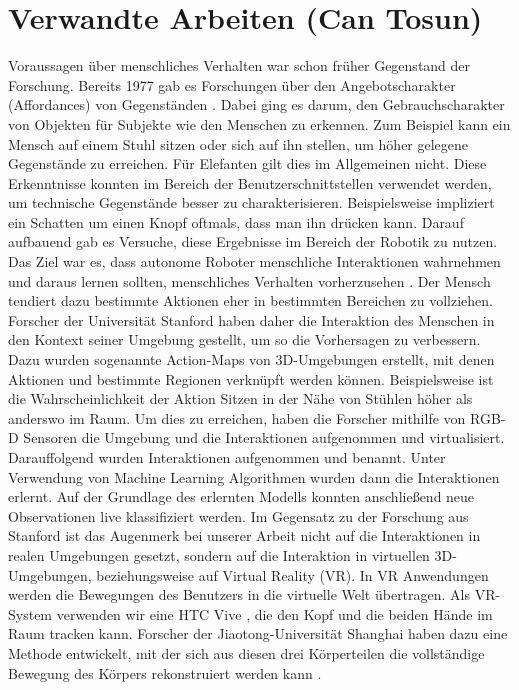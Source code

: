 
\section{Verwandte Arbeiten \tiny{(Can Tosun)}}
Voraussagen über menschliches Verhalten war schon früher Gegenstand der Forschung. Bereits 1977 gab es Forschungen über den Angebotscharakter (Affordances) von Gegenständen \cite{gibson}. Dabei ging es darum, den Gebrauchscharakter von Objekten für Subjekte wie den Menschen zu erkennen. Zum Beispiel kann ein Mensch auf einem Stuhl sitzen oder sich auf ihn stellen, um höher gelegene Gegenstände zu erreichen. Für Elefanten gilt dies im Allgemeinen nicht. Diese Erkenntnisse konnten im Bereich der Benutzerschnittstellen verwendet werden, um technische Gegenstände besser zu charakterisieren. Beispielsweise impliziert ein Schatten um einen Knopf oftmals, dass man ihn drücken kann.
\newline
Darauf aufbauend gab es Versuche, diese Ergebnisse im Bereich der Robotik zu nutzen. Das Ziel war es, dass autonome Roboter menschliche Interaktionen wahrnehmen und daraus lernen sollten, menschliches Verhalten vorherzusehen \cite{fritz, montesano,stark, sun}.
\newline
Der Mensch tendiert dazu bestimmte Aktionen eher in bestimmten Bereichen zu vollziehen. Forscher der Universität Stanford haben daher
die Interaktion des Menschen in den Kontext seiner Umgebung gestellt, um so die Vorhersagen zu verbessern. Dazu wurden sogenannte
Action-Maps von 3D-Umgebungen erstellt, mit denen Aktionen und bestimmte Regionen verknüpft werden können. Beispielsweise ist
die Wahrscheinlichkeit der Aktion \glqq{}Sitzen\grqq{} in der Nähe von Stühlen höher als anderswo im Raum. Um dies zu erreichen, haben die Forscher mithilfe von RGB-D Sensoren die Umgebung und die Interaktionen aufgenommen und virtualisiert. Darauffolgend wurden Interaktionen aufgenommen und benannt. Unter Verwendung von Machine Learning Algorithmen wurden dann die Interaktionen erlernt. Auf der Grundlage des erlernten Modells konnten anschließend neue Observationen live klassifiziert werden. \cite{scene-grok}
\newline
Im Gegensatz zu der Forschung aus Stanford ist das Augenmerk bei unserer Arbeit nicht auf die Interaktionen in realen Umgebungen gesetzt, sondern auf die Interaktion in virtuellen 3D-Umgebungen, beziehungsweise auf Virtual Reality (VR). In VR Anwendungen werden die Bewegungen des Benutzers in die virtuelle Welt übertragen.\newline
Als VR-System verwenden wir eine HTC Vive \cite{htc-vive}, die den Kopf und die beiden Hände im Raum tracken kann. Forscher der Jiaotong-Universität Shanghai haben dazu eine Methode entwickelt, mit der sich aus diesen drei Körperteilen die vollständige Bewegung des Körpers rekonstruiert werden kann \cite{body-reconstruction}.



